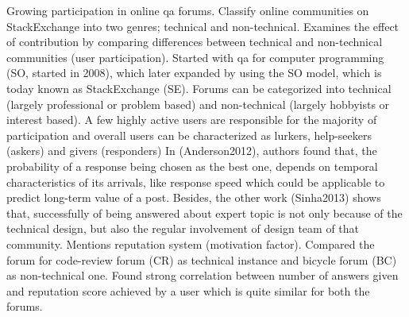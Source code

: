 Growing participation in online qa forums. Classify online communities on StackExchange into two genres; technical and non-technical. Examines the effect of contribution by comparing differences between technical and non-technical communities (user participation). Started with qa for computer programming (SO, started in 2008), which later expanded by using the SO model, which is today known as StackExchange (SE). Forums can be categorized into technical (largely professional or problem based) and non-technical (largely hobbyists or interest based). A few highly active users are responsible for the majority of participation and overall users can be characterized as lurkers, help-seekers (askers) and givers (responders)
In (Anderson2012), authors found that, the probability of a response being chosen as the best one, depends on temporal characteristics of its arrivals, like response speed which could be applicable to predict long-term value of a post. Besides, the other work (Sinha2013) shows that, successfully of being answered about expert topic is not only because of the technical design, but also the regular involvement of design team of that community. Mentions reputation system (motivation factor). 
Compared the forum for code-review forum (CR) as technical instance and bicycle forum (BC) as non-technical one. Found strong correlation between number of answers given and reputation score achieved by a user which is quite similar for both the forums.
\cite{Ahmed2015}

